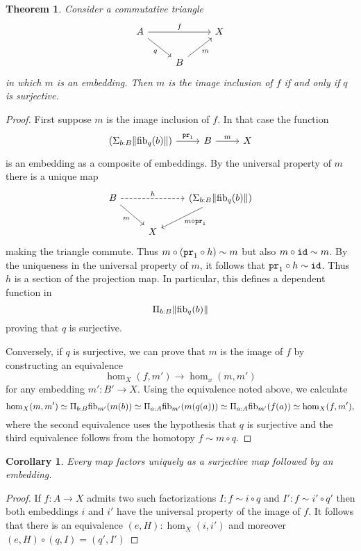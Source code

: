 \documentclass{amsart}
\theoremstyle{theorem}
\newtheorem*{thm}{Theorem}
\newtheorem*{cor}{Corollary}
\theoremstyle{definition}
\theoremstyle{remark}
\newcommand{\0}{\mathbbe{0}}
\newcommand{\1}{\mathbbe{1}}
\newcommand{\2}{\mathbbe{2}}
\newcommand{\3}{\mathbbe{3}}
\newcommand{\4}{\mathbbe{4}}
\newcommand{\term}[1]{{\textup{\texttt{#1}}}}
\newcommand{\type}[1]{{\textup{#1}}}
\newcommand{\id}{\term{id}}
\newcommand{\pr}{\term{pr}}
\newcommand{\fib}{\type{fib}}
\newcommand{\mere}[1]{\|{#1}\|}
\begin{document}
\begin{thm} Consider a commutative triangle
\[
\begin{tikzcd} A \arrow[rr, "f"] \arrow[dr, "q"'] & & X \\ & B \arrow[ur, "m"']
\end{tikzcd}
\]
in which $m$ is an embedding. Then $m$ is the image inclusion of $f$ if and only if $q$ is surjective.
\end{thm}
\begin{proof}
First suppose $m$ is the image inclusion of $f$. In that case the function
\[
\begin{tikzcd} \left( \Sigma_{b:B} \mere{\fib_q(b)} \right) \arrow[r, "\pr_1"] & B \arrow[r, "m"] & X
\end{tikzcd}
\]
is an embedding as a composite of embeddings. By the universal property of $m$ there is a unique map 
\[
\begin{tikzcd} B \arrow[dr, "m"'] \arrow[rr, dashed, "h"] & & \left( \Sigma_{b:B} \mere{\fib_q(b)} \right)  \arrow[dl, "m \circ \pr_1"]
\\ & X
\end{tikzcd}
\]
making the triangle commute. Thus $m \circ (\pr_1 \circ h) \sim m$ but also $m \circ \id  \sim m$. By the uniqueness in the universal property of $m$, it follows that $\pr_1 \circ h \sim\id$. Thus $h$ is a section of the projection map. In particular, this defines a dependent function in
\[  \Pi_{b:B} \mere{\fib_q(b)}\]
proving that $q$ is surjective.

Conversely, if $q$ is surjective, we can prove that $m$ is the image of $f$ by constructing an equivalence
\[ \hom_X(f,m') \to \hom_x(m,m')\]
for any embedding $m' \colon B' \to X$. Using the equivalence noted above, we calculate
\[ \hom_X(m,m') \simeq \Pi_{b:B} \fib_{m'}(m(b)) \simeq \Pi_{a:A} \fib_{m'}(m(q(a))) \simeq \Pi_{a:A} \fib_{m'}(f(a)) \simeq \hom_X(f,m'),\] where the second equivalence uses the hypothesis that $q$ is surjective and the third equivalence follows from the homotopy $f \sim m \circ q$.
\end{proof}

\begin{cor} Every map factors uniquely as a surjective map followed by an embedding.
\end{cor}
\begin{proof}
If $f \colon A \to X$ admits two such factorizations $I : f \sim  i\circ q$ and $I': f \sim i' \circ q'$ then both embeddings $i$ and $i'$ have the universal property of the image of $f$. It follows that there is an equivalence $(e,H) : \hom_X(i,i')$ and moreover $(e,H) \circ (q,I) = (q',I')$
\end{proof}
\end{document}
